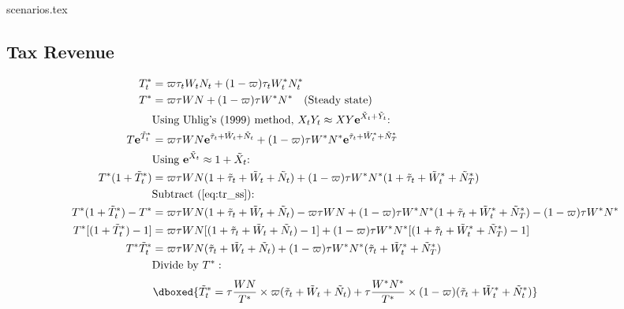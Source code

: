 \pagebreak
{scenarios.tex}
\pagebreak
\subsection*{Tax Revenue}
\begin{align*}
    T^*_t &= \varpi\tau_t W_t N_t + (1-\varpi)\tau_t W^*_t N^*_t \\
    T^* &= \varpi\tau W N + (1-\varpi)\tau W^* N^* \label{eq:tr_ss} \quad \text{(Steady state)}\\
    &\text{Using Uhlig's (1999) method, $X_tY_t \approx XY\mathbf{e}^{\tilde{X}_t + \tilde{Y}_t}$: }\\
    T\mathbf{e}^{\tilde{T}^*_t} &= \varpi \tau W N \mathbf{e}^{\tilde{\tau}_t+\tilde{W}_t+\tilde{N}_t} + (1-\varpi) \tau W^* N^* \mathbf{e}^{\tilde{\tau}_t+\tilde{W}^*_t+\tilde{N}^*_T} \\
    &\text{Using $\mathbf{e}^{\tilde{X}_t} \approx 1 + {\tilde{X}_t}$: }\\
    T^* (1 + {\tilde{T}^*_t}) &= \varpi \tau W N (1 + {\tilde{\tau}_t+\tilde{W}_t+\tilde{N}_t}) + (1-\varpi) \tau W^* N^* (1 + {\tilde{\tau}_t+\tilde{W}^*_t+\tilde{N}^*_T}) \\
    &\text{Subtract (\ref{eq:tr_ss}): } \\
    T^* (1 + {\tilde{T}^*_t}) - T^* &= \varpi \tau W N (1 + {\tilde{\tau}_t+\tilde{W}_t+\tilde{N}_t}) - \varpi\tau W N + (1-\varpi) \tau W^* N^* (1 + {\tilde{\tau}_t+\tilde{W}^*_t+\tilde{N}^*_T}) - (1-\varpi)\tau W^* N^* \\
    T^*[(1 + {\tilde{T}^*_t}) - 1] &= \varpi \tau W N [(1 + {\tilde{\tau}_t+\tilde{W}_t+\tilde{N}_t}) - 1] + (1-\varpi) \tau W^* N^* [(1 + {\tilde{\tau}_t+\tilde{W}^*_t+\tilde{N}^*_T}) - 1] \\
    T^*\tilde{T}^*_t &= \varpi \tau W N (\tilde{\tau}_t + \tilde{W}_t + \tilde{N}_t) + (1-\varpi) \tau W^* N^* (\tilde{\tau}_t+\tilde{W}^*_t+\tilde{N}^*_T) \\
    &\text{Divide by $T^*$}:
\end{align*}
\begin{equation}
    \dboxed{\tilde{T}^*_t = \tau\frac{ W N}{T^*}\times \varpi (\tilde{\tau}_t + \tilde{W}_t + \tilde{N}_t) + \tau \frac{ W^* N^*}{T^*} \times (1-\varpi) (\tilde{\tau}_t+\tilde{W}^*_t+\tilde{N}^*_t)}
\end{equation}

